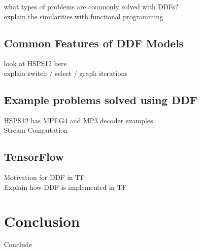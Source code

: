 \documentclass[conference,a4paper]{IEEEtran}
\begin{document}
what types of problems are commonly solved with DDFs? \\
explain the similarities with functional programming

\subsection{Common Features of DDF Models}
look at HSPS12 here \\
explain switch / select / graph iterations \\

\subsection{Example problems solved using DDF}
HSPS12 has MPEG4 and MP3 decoder examples \\
Stream Computation \\

\subsection{TensorFlow}
Motivation for DDF in TF \\
Explain how DDF is implemented in TF \\

\section{Conclusion}
Conclude \\

%



\end{document}
